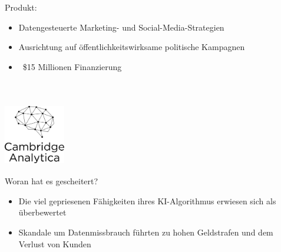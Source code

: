 \documentclass{beamer}
\begin{document}
\begin{frame}
    \vspace{-0.5cm}
    Produkt: \\
    \begin{itemize}
        \item<1-> Datengesteuerte Marketing- und Social-Media-Strategien
        \item<2-> Ausrichtung auf öffentlichkeitswirksame politische Kampagnen
        \item<3-> ~\$15 Millionen Finanzierung
    \end{itemize} ~\\
\end{frame}

\begin{frame}
    \frametitle{\includegraphics[width=0.2\textwidth]{cambridge-analytica.png}}
    Woran hat es gescheitert? \\
    \begin{itemize}
        \item<1-> Die viel gepriesenen Fähigkeiten ihres KI-Algorithmus erwiesen sich als überbewertet
        \item<2-> Skandale um Datenmissbrauch führten zu hohen Geldstrafen und dem Verlust von Kunden
    \end{itemize} ~\\
\end{frame}
\end{document}
